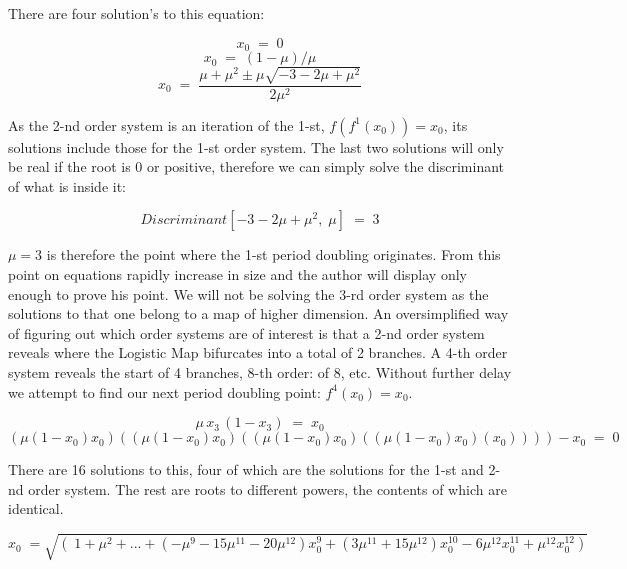 There are four solution's to this equation:

\begin{equation}
x_0\;=\; 0
\end{equation}
\begin{equation}
x_0\;=\; (1-\mu)/\mu
\end{equation}
\begin{equation}
x_0\;=\; \frac{\mu + \mu^2 \pm \mu \sqrt{-3 - 2 \mu + \mu^2}}{2 \mu^2}
\end{equation}

As the 2-nd order system is an iteration of the 1-st, $f(f^1(x_0))=x_0$, its solutions
include those for the 1-st order system. The last two solutions will only be real if the root is 0 or positive,
therefore we can simply solve the discriminant of what is inside it:

\begin{equation}
Discriminant[-3 - 2 \mu + \mu^2,\;\mu]\;=\;3
\end{equation}

$\mu = 3$ is therefore the point where the 1-st period doubling originates. From this point on
equations rapidly increase in size and the author will display only enough to prove his point.
We will not be solving the 3-rd order system as the solutions to that one belong to a map of higher
dimension. An oversimplified way of figuring out which order systems are of interest is that a 2-nd order
system reveals where the Logistic Map bifurcates into a total of 2 branches. A 4-th order system reveals the start
of 4 branches, 8-th order: of 8, etc. Without further delay we attempt to find our next period doubling point:
$f^4(x_0) = x_0$.

\begin{equation}
\mu\,x_3\,(1-x_3)\;=\;x_0
\end{equation}
\begin{equation}
(\mu (1 - x_0) x_0)((\mu (1 - x_0) x_0)((\mu (1 - x_0) x_0)((\mu (1 - x_0) x_0)(x_0))))-x_0\;=\;0
\end{equation}

There are 16 solutions to this, four of which are the solutions for the
1-st and 2-nd order system. The rest are roots to different powers, the contents of which are identical.

\begin{equation}
x_0\;=\sqrt{\left(\;1 + \mu^2 + ... +(-\mu^9 - 15 \mu^11 - 20 \mu^12) x_0^9 + (3 \mu^11 + 
    15 \mu^12) x_0^10 - 6 \mu^12 x_0^11 + \mu^12 x_0^12\right)}
\end{equation}

